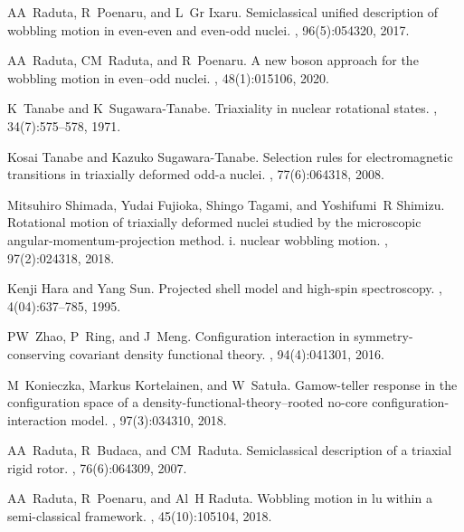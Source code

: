 \documentclass[11pt]{article}
\begin{document}
\begin{thebibliography}{99}
AA~Raduta, R~Poenaru, and L~Gr Ixaru.
\newblock Semiclassical unified description of wobbling motion in even-even and
  even-odd nuclei.
, 96(5):054320, 2017.

AA~Raduta, CM~Raduta, and R~Poenaru.
\newblock A new boson approach for the wobbling motion in even--odd nuclei.
,
  48(1):015106, 2020.

K~Tanabe and K~Sugawara-Tanabe.
\newblock Triaxiality in nuclear rotational states.
, 34(7):575--578, 1971.

Kosai Tanabe and Kazuko Sugawara-Tanabe.
\newblock Selection rules for electromagnetic transitions in triaxially
  deformed odd-a nuclei.
, 77(6):064318, 2008.

Mitsuhiro Shimada, Yudai Fujioka, Shingo Tagami, and Yoshifumi~R Shimizu.
\newblock Rotational motion of triaxially deformed nuclei studied by the
  microscopic angular-momentum-projection method. i. nuclear wobbling motion.
, 97(2):024318, 2018.

Kenji Hara and Yang Sun.
\newblock Projected shell model and high-spin spectroscopy.
, 4(04):637--785,
  1995.

PW~Zhao, P~Ring, and J~Meng.
\newblock Configuration interaction in symmetry-conserving covariant density
  functional theory.
, 94(4):041301, 2016.

M~Konieczka, Markus Kortelainen, and W~Satu{\l}a.
\newblock Gamow-teller response in the configuration space of a
  density-functional-theory--rooted no-core configuration-interaction model.
, 97(3):034310, 2018.

AA~Raduta, R~Budaca, and CM~Raduta.
\newblock Semiclassical description of a triaxial rigid rotor.
, 76(6):064309, 2007.

AA~Raduta, R~Poenaru, and Al~H Raduta.
\newblock Wobbling motion in lu within a semi-classical framework.
,
  45(10):105104, 2018.


\end{thebibliography}
\end{document}
